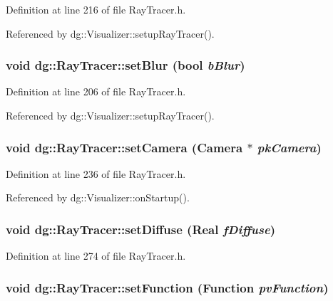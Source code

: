 Definition at line 216 of file Ray\-Tracer.h.

Referenced by dg::Visualizer::setup\-Ray\-Tracer().
\subsubsection{\setlength{\rightskip}{0pt plus 5cm}void dg::Ray\-Tracer::set\-Blur (bool {\em b\-Blur})\hspace{0.3cm}{\tt  [inline]}}\label{classdg_1_1RayTracer_a18}




Definition at line 206 of file Ray\-Tracer.h.

Referenced by dg::Visualizer::setup\-Ray\-Tracer().
\subsubsection{\setlength{\rightskip}{0pt plus 5cm}void dg::Ray\-Tracer::set\-Camera ({\bf Camera} $\ast$ {\em pk\-Camera})\hspace{0.3cm}{\tt  [inline]}}\label{classdg_1_1RayTracer_a2}




Definition at line 236 of file Ray\-Tracer.h.

Referenced by dg::Visualizer::on\-Startup().
\subsubsection{\setlength{\rightskip}{0pt plus 5cm}void dg::Ray\-Tracer::set\-Diffuse ({\bf Real} {\em f\-Diffuse})\hspace{0.3cm}{\tt  [inline]}}\label{classdg_1_1RayTracer_a25}




Definition at line 274 of file Ray\-Tracer.h.
\subsubsection{\setlength{\rightskip}{0pt plus 5cm}void dg::Ray\-Tracer::set\-Function ({\bf Function} {\em pv\-Function})\hspace{0.3cm}{\tt  [inline]}}\label{classdg_1_1RayTracer_a4}




